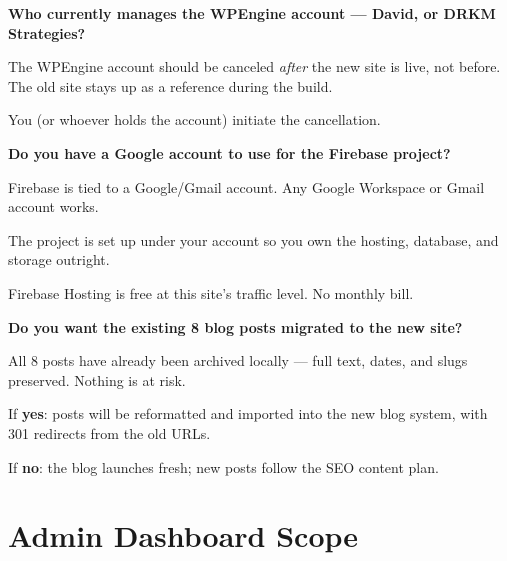 \documentclass[11pt, letterpaper]{article}
\begin{document}
\begin{checklist}
  \item \textbf{Who currently manages the WPEngine account --- David, or DRKM Strategies?}
    \begin{checklist}
      \item The WPEngine account should be canceled \emph{after} the new site is live,
            not before. The old site stays up as a reference during the build.
      \item You (or whoever holds the account) initiate the cancellation.
    \end{checklist}

  \item \textbf{Do you have a Google account to use for the Firebase project?}
    \begin{checklist}
      \item Firebase is tied to a Google/Gmail account. Any Google Workspace or
            Gmail account works.
      \item The project is set up under your account so you own the hosting,
            database, and storage outright.
      \item Firebase Hosting is free at this site's traffic level. No monthly bill.
    \end{checklist}

  \item \textbf{Do you want the existing 8 blog posts migrated to the new site?}
    \begin{checklist}
      \item All 8 posts have already been archived locally --- full text, dates,
            and slugs preserved. Nothing is at risk.
      \item If \textbf{yes}: posts will be reformatted and imported into the new
            blog system, with 301 redirects from the old URLs.
      \item If \textbf{no}: the blog launches fresh; new posts follow the SEO
            content plan.
    \end{checklist}
\end{checklist}

\section{Admin Dashboard Scope}
\end{document}
